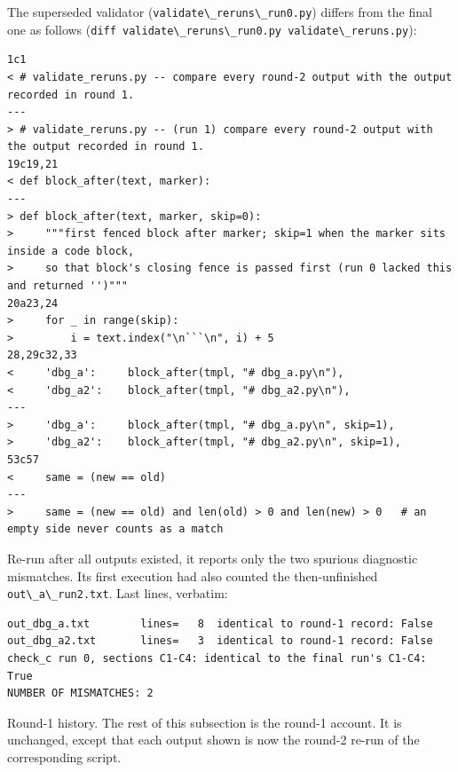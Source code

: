\documentclass[11pt,a4paper]{article}
\newcommand{\passthrough}[1]{#1}
\begin{document}
The superseded validator
(\passthrough{\lstinline!validate\_reruns\_run0.py!}) differs from the
final one as follows
(\passthrough{\lstinline!diff validate\_reruns\_run0.py validate\_reruns.py!}):

\begin{lstlisting}
1c1
< # validate_reruns.py -- compare every round-2 output with the output recorded in round 1.
---
> # validate_reruns.py -- (run 1) compare every round-2 output with the output recorded in round 1.
19c19,21
< def block_after(text, marker):
---
> def block_after(text, marker, skip=0):
>     """first fenced block after marker; skip=1 when the marker sits inside a code block,
>     so that block's closing fence is passed first (run 0 lacked this and returned '')"""
20a23,24
>     for _ in range(skip):
>         i = text.index("\n```\n", i) + 5
28,29c32,33
<     'dbg_a':     block_after(tmpl, "# dbg_a.py\n"),
<     'dbg_a2':    block_after(tmpl, "# dbg_a2.py\n"),
---
>     'dbg_a':     block_after(tmpl, "# dbg_a.py\n", skip=1),
>     'dbg_a2':    block_after(tmpl, "# dbg_a2.py\n", skip=1),
53c57
<     same = (new == old)
---
>     same = (new == old) and len(old) > 0 and len(new) > 0   # an empty side never counts as a match
\end{lstlisting}

Re-run after all outputs existed, it reports only the two spurious
diagnostic mismatches. Its first execution had also counted the
then-unfinished \passthrough{\lstinline!out\_a\_run2.txt!}. Last lines,
verbatim:

\begin{lstlisting}
out_dbg_a.txt        lines=   8  identical to round-1 record: False
out_dbg_a2.txt       lines=   3  identical to round-1 record: False
check_c run 0, sections C1-C4: identical to the final run's C1-C4: True
NUMBER OF MISMATCHES: 2
\end{lstlisting}

Round-1 history. The rest of this subsection is the round-1 account. It
is unchanged, except that each output shown is now the round-2 re-run of
the corresponding script.
\end{document}
